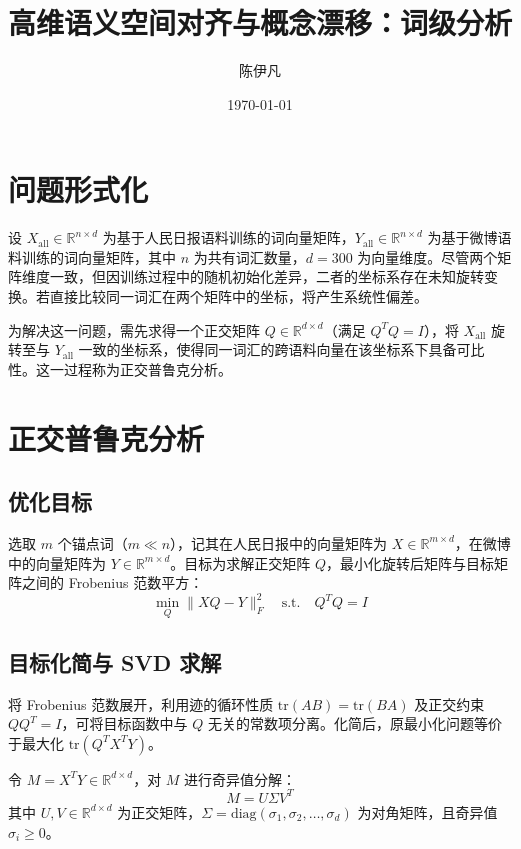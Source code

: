 \documentclass{article}
\title{高维语义空间对齐与概念漂移：词级分析}
\author{陈伊凡}
\date{\today}
\begin{document}
\maketitle

\section{问题形式化}

设 $X_{\text{all}} \in \mathbb{R}^{n \times d}$ 为基于人民日报语料训练的词向量矩阵，$Y_{\text{all}} \in \mathbb{R}^{n \times d}$ 为基于微博语料训练的词向量矩阵，其中 $n$ 为共有词汇数量，$d = 300$ 为向量维度。尽管两个矩阵维度一致，但因训练过程中的随机初始化差异，二者的坐标系存在未知旋转变换。若直接比较同一词汇在两个矩阵中的坐标，将产生系统性偏差。

为解决这一问题，需先求得一个正交矩阵 $Q \in \mathbb{R}^{d \times d}$（满足 $Q^T Q = I$），将 $X_{\text{all}}$ 旋转至与 $Y_{\text{all}}$ 一致的坐标系，使得同一词汇的跨语料向量在该坐标系下具备可比性。这一过程称为正交普鲁克分析。

\section{正交普鲁克分析}

\subsection{优化目标}

选取 $m$ 个锚点词（$m \ll n$），记其在人民日报中的向量矩阵为 $X \in \mathbb{R}^{m \times d}$，在微博中的向量矩阵为 $Y \in \mathbb{R}^{m \times d}$。目标为求解正交矩阵 $Q$，最小化旋转后矩阵与目标矩阵之间的 Frobenius 范数平方：
\[
\min_{Q} \| XQ - Y \|_F^2 \quad \text{s.t.} \quad Q^T Q = I
\]

\subsection{目标化简与 SVD 求解}

将 Frobenius 范数展开，利用迹的循环性质 $\text{tr}(AB) = \text{tr}(BA)$ 及正交约束 $QQ^T = I$，可将目标函数中与 $Q$ 无关的常数项分离。化简后，原最小化问题等价于最大化 $\text{tr}(Q^T X^T Y)$。

令 $M = X^T Y \in \mathbb{R}^{d \times d}$，对 $M$ 进行奇异值分解：
\[
M = U \Sigma V^T
\]
其中 $U, V \in \mathbb{R}^{d \times d}$ 为正交矩阵，$\Sigma = \text{diag}(\sigma_1, \sigma_2, \dots, \sigma_d)$ 为对角矩阵，且奇异值 $\sigma_i \geq 0$。
\end{document}
